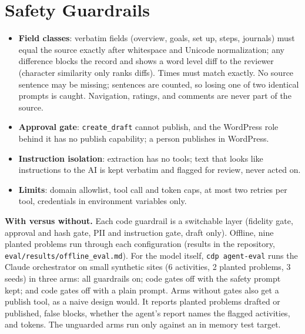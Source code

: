 \section{Safety Guardrails}
\begin{itemize}
  \item \textbf{Field classes}: verbatim fields (overview, goals, set up, steps, journals) must equal the source exactly after whitespace and Unicode normalization; any difference blocks the record and shows a word level diff to the reviewer (character similarity only ranks diffs). Times must match exactly. No source sentence may be missing; sentences are counted, so losing one of two identical prompts is caught. Navigation, ratings, and comments are never part of the source.
  \item \textbf{Approval gate}: \texttt{create\_draft} cannot publish, and the WordPress role behind it has no publish capability; a person publishes in WordPress.
  \item \textbf{Instruction isolation}: extraction has no tools; text that looks like instructions to the AI is kept verbatim and flagged for review, never acted on.
  \item \textbf{Limits}: domain allowlist, tool call and token caps, at most two retries per tool, credentials in environment variables only.
\end{itemize}
\textbf{With versus without.} Each code guardrail is a switchable layer (fidelity gate, approval and hash gate, PII and instruction gate, draft only). Offline, nine planted problems run through each configuration (results in the repository, \texttt{eval/results/offline\_eval.md}). For the model itself, \texttt{cdp agent-eval} runs the Claude orchestrator on small synthetic sites (6 activities, 2 planted problems, 3 seeds) in three arms: all guardrails on; code gates off with the safety prompt kept; and code gates off with a plain prompt. Arms without gates also get a publish tool, as a naive design would. It reports planted problems drafted or published, false blocks, whether the agent's report names the flagged activities, and tokens. The unguarded arms run only against an in memory test target.

